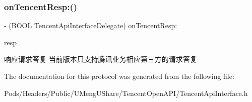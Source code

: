 \subsubsection{\texorpdfstring{on\+Tencent\+Resp\+:()}{onTencentResp:()}\hspace{0.1cm}{\footnotesize\ttfamily [2/2]}}
{\footnotesize\ttfamily -\/ (B\+O\+OL Tencent\+Api\+Interface\+Delegate) on\+Tencent\+Resp\+: \begin{DoxyParamCaption}\item[{(\mbox{\hyperlink{interface_tencent_api_resp}{Tencent\+Api\+Resp}} $\ast$)}]{resp }\end{DoxyParamCaption}\hspace{0.3cm}{\ttfamily [optional]}}

响应请求答复 当前版本只支持腾讯业务相应第三方的请求答复 

The documentation for this protocol was generated from the following file\+:\begin{DoxyCompactItemize}
\item 
Pods/\+Headers/\+Public/\+U\+Meng\+U\+Share/\+Tencent\+Open\+A\+P\+I/Tencent\+Api\+Interface.\+h\end{DoxyCompactItemize}
